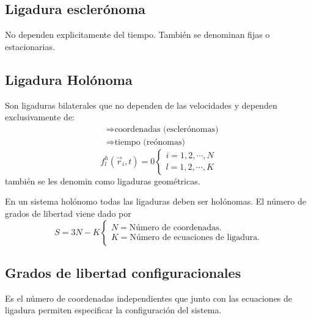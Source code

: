 \documentclass[../main]{subfiles}
\begin{document}
\subsection{Ligadura esclerónoma}

No dependen explicitamente del tiempo. También se denominan fijas o estacionarias.

\subsection{Ligadura Holónoma}

Son ligaduras bilaterales que no dependen de las velocidades y dependen exclusivamente de:
\begin{align*}
    &\Rightarrow \text{coordenadas (esclerónomas)} \\
    &\Rightarrow \text{tiempo (reónomas)} 
\end{align*}
\begin{equation}
    f^h_l(\vec{r}_i, t)=0 
    \left\{
    \begin{array}{c}
        i=1,2,\cdots, N \\
        l=1,2,\cdots, K
    \end{array}
    \right.
\end{equation}
también se les denomin como ligaduras geométricas.

En un sistema holónomo todas las ligaduras deben ser holónomas. El número de grados de libertad viene dado por
\begin{equation}
    S=3N-K 
    \left\{
    \begin{array}{c}
        N= \text{Número de coordenadas.} \qquad \qquad  \\
        K= \text{Número de ecuaciones de ligadura.}
    \end{array}
    \right.
\end{equation}

\subsection{Grados de libertad configuracionales}

Es el número de coordenadas independientes que junto con las ecuaciones de ligadura permiten especificar la configuración del sistema.
\end{document}
